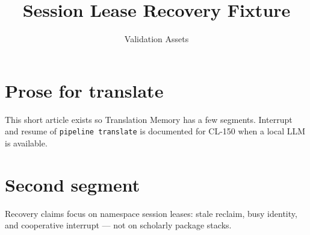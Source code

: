 \documentclass[11pt]{article}
\title{Session Lease Recovery Fixture}
\author{Validation Assets}
\date{}
\begin{document}
\maketitle

\section{Prose for translate}

This short article exists so Translation Memory has a few segments.
Interrupt and resume of \texttt{pipeline translate} is documented for CL-150
when a local LLM is available.

\section{Second segment}

Recovery claims focus on namespace session leases: stale reclaim, busy
identity, and cooperative interrupt — not on scholarly package stacks.
\end{document}
